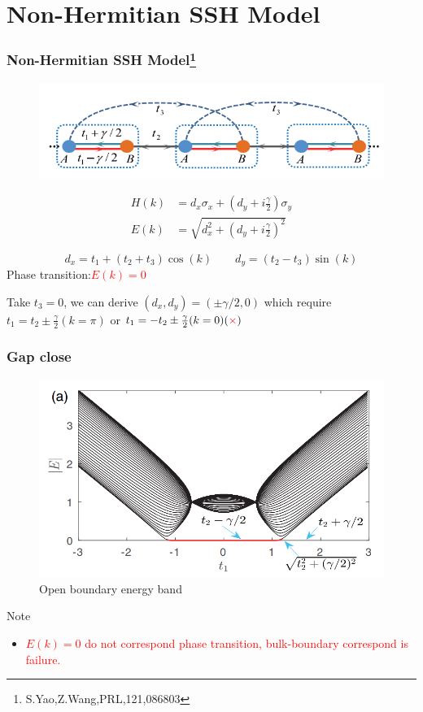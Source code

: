 \documentclass{beamer}
\begin{document}
\section{Non-Hermitian SSH Model}
  \begin{frame}
    \frametitle{Non-Hermitian SSH Model\footnote{S.Yao,Z.Wang,PRL,121,086803}}
    \begin{figure}
    \includegraphics[scale=0.5]{figure/ssh.png}
    \end{figure}
    \begin{equation}
    \begin{aligned}
    H(k)&=d_x\sigma_x+(d_y+i\frac{\gamma}{2})\sigma_y\\
    E(k)&=\sqrt{d_x^2+(d_y+i\frac{\gamma}{2})^2}
    \end{aligned}
   \end{equation}
   
   \begin{equation*}
   d_x=t_1+(t_2+t_3)\cos(k)\qquad d_y=(t_2-t_3)\sin(k)
   \end{equation*}
 Phase transition:\textcolor{red}{$E(k)=0$}
 
Take $t_3=0$, we can derive $(d_x,d_y)=(\pm\gamma/2,0)$ which require $t_1=t_2\pm\frac{\gamma}{2}(k=\pi)$ or $t_1=-t_2\pm\frac{\gamma}{2}(k=0)(\textcolor{red}{\times})$
  \end{frame}
  \begin{frame}
  \frametitle{Gap close}
  \begin{figure}
  	\includegraphics[scale=0.4]{figure/band.png}
  	\caption{Open boundary energy band}
  \end{figure}
\begin{block}{Note}
	\begin{itemize}
	\item\textcolor{red}{ $E(k)=0$ do not correspond phase transition, bulk-boundary correspond is failure.}	
	\end{itemize}
\end{block}
\end{frame}
\end{document}
